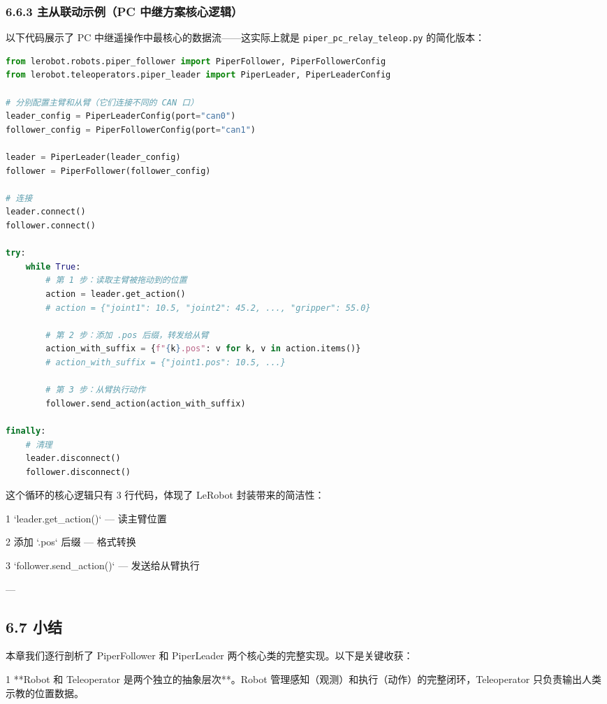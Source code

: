 \documentclass[UTF8,a4paper,11pt]{ctexart}
\begin{document}
{\subsubsection{6.6.3 主从联动示例（PC 中继方案核心逻辑）}

以下代码展示了 PC 中继遥操作中最核心的数据流——这实际上就是 \texttt{piper_pc_relay_teleop.py} 的简化版本：

\begin{lstlisting}[language=python]
from lerobot.robots.piper_follower import PiperFollower, PiperFollowerConfig
from lerobot.teleoperators.piper_leader import PiperLeader, PiperLeaderConfig

# 分别配置主臂和从臂（它们连接不同的 CAN 口）
leader_config = PiperLeaderConfig(port="can0")
follower_config = PiperFollowerConfig(port="can1")

leader = PiperLeader(leader_config)
follower = PiperFollower(follower_config)

# 连接
leader.connect()
follower.connect()

try:
    while True:
        # 第 1 步：读取主臂被拖动到的位置
        action = leader.get_action()
        # action = {"joint1": 10.5, "joint2": 45.2, ..., "gripper": 55.0}

        # 第 2 步：添加 .pos 后缀，转发给从臂
        action_with_suffix = {f"{k}.pos": v for k, v in action.items()}
        # action_with_suffix = {"joint1.pos": 10.5, ...}

        # 第 3 步：从臂执行动作
        follower.send_action(action_with_suffix)

finally:
    # 清理
    leader.disconnect()
    follower.disconnect()
\end{lstlisting}

这个循环的核心逻辑只有 3 行代码，体现了 LeRobot 封装带来的简洁性：

\item[1] `leader.get_action()` — 读主臂位置
\item[2] 添加 `.pos` 后缀 — 格式转换
\item[3] `follower.send_action()` — 发送给从臂执行

---

\subsection{6.7 小结}

本章我们逐行剖析了 PiperFollower 和 PiperLeader 两个核心类的完整实现。以下是关键收获：

\item[1] **Robot 和 Teleoperator 是两个独立的抽象层次**。Robot 管理感知（观测）和执行（动作）的完整闭环，Teleoperator 只负责输出人类示教的位置数据。

}
\end{document}

